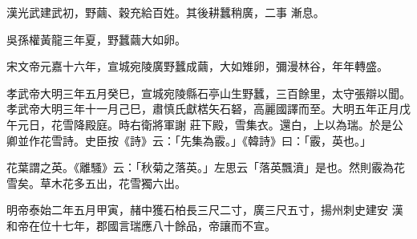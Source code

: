 \begin{pinyinscope}
 漢光武建武初，野繭、穀充給百姓。其後耕蠶稍廣，二事
 漸息。



 吳孫權黃龍三年夏，野蠶繭大如卵。



 宋文帝元嘉十六年，宣城宛陵廣野蠶成繭，大如雉卵，彌漫林谷，年年轉盛。



 孝武帝大明三年五月癸巳，宣城宛陵縣石亭山生野蠶，三百餘里，太守張辯以聞。孝武帝大明三年十一月己巳，肅慎氏獻楛矢石砮，高麗國譯而至。大明五年正月戊午元日，花雪降殿庭。時右衛將軍謝
 莊下殿，雪集衣。還白，上以為瑞。於是公卿並作花雪詩。史臣按《詩》云：「先集為霰。」《韓詩》曰：「霰，英也。」



 花葉謂之英。《離騷》云：「秋菊之落英。」左思云「落英飄濆」是也。然則霰為花雪矣。草木花多五出，花雪獨六出。



 明帝泰始二年五月甲寅，赭中獲石柏長三尺二寸，廣三尺五寸，揚州刺史建安
 漢和帝在位十七年，郡國言瑞應八十餘品，帝讓而不宣。



\end{pinyinscope}